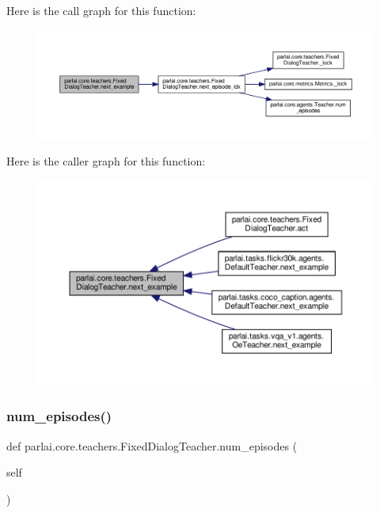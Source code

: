 Here is the call graph for this function\+:
\nopagebreak
\begin{figure}[H]
\begin{center}
\leavevmode
\includegraphics[width=350pt]{classparlai_1_1core_1_1teachers_1_1FixedDialogTeacher_aa6782a610b00aa0675522aa58b03f20c_cgraph}
\end{center}
\end{figure}
Here is the caller graph for this function\+:
\nopagebreak
\begin{figure}[H]
\begin{center}
\leavevmode
\includegraphics[width=350pt]{classparlai_1_1core_1_1teachers_1_1FixedDialogTeacher_aa6782a610b00aa0675522aa58b03f20c_icgraph}
\end{center}
\end{figure}
\mbox{\label{classparlai_1_1core_1_1teachers_1_1FixedDialogTeacher_a51e3463e7b7b44a6ea8b43fc82aacb75}} 
\subsubsection{\texorpdfstring{num\+\_\+episodes()}{num\_episodes()}}
{\footnotesize\ttfamily def parlai.\+core.\+teachers.\+Fixed\+Dialog\+Teacher.\+num\+\_\+episodes (\begin{DoxyParamCaption}\item[{}]{self }\end{DoxyParamCaption})}

